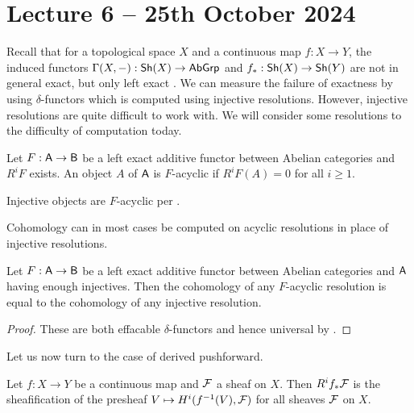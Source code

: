 \section{Lecture 6 -- 25th October 2024}\label{lec: lecture 6}
Recall that for a topological space $X$ and a continuous map $f:X\to Y$, the induced functors $\Gamma(X,-):\mathsf{Sh}(X)\to\mathsf{AbGrp}$ and $f_{*}:\mathsf{Sh}(X)\to\mathsf{Sh}(Y)$ are not in general exact, but only left exact . We can measure the failure of exactness by using $\delta$-functors which is computed using injective resolutions. However, injective resolutions are quite difficult to work with. We will consider some resolutions to the difficulty of computation today. 
\begin{definition}\label{def: F-acyclic}
    Let $F:\mathsf{A}\to\mathsf{B}$ be a left exact additive functor between Abelian categories and $R^{i}F$ exists. An object $A$ of $\mathsf{A}$ is $F$-acyclic if $R^{i}F(A)=0$ for all $i\geq1$. 
\end{definition}
\begin{remark}
    Injective objects are $F$-acyclic per . 
\end{remark}
Cohomology can in most cases be computed on acyclic resolutions in place of injective resolutions. 
\begin{proposition}\label{prop: acyclic resolutions replace }
    Let $F:\mathsf{A}\to\mathsf{B}$ be a left exact additive functor between Abelian categories and $\mathsf{A}$ having enough injectives. Then the cohomology of any $F$-acyclic resolution is equal to the cohomology of any injective resolution. 
\end{proposition}
\begin{proof}
    These are both effacable $\delta$-functors and hence universal by .
\end{proof}
Let us now turn to the case of derived pushforward. 
\begin{proposition}\label{prop: derived pushforward is sheafification of inverse image cohomology sheaf}
    Let $f:X\to Y$ be a continuous map and $\mathcal{F}$ a sheaf on $X$. Then $R^{i}f_{*}\mathcal{F}$ is the sheafification of the presheaf $V\mapsto H^{i}(f^{-1}(V),\mathcal{F})$ for all sheaves $\mathcal{F}$ on $X$. 
\end{proposition}
